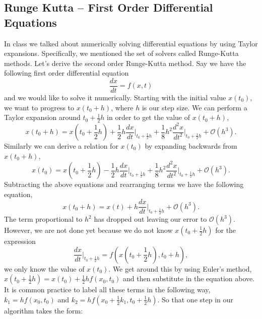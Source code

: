 \documentclass{article}
\begin{document}
\subsection{Runge Kutta -- First Order Differential Equations}
In class we talked about numerically solving differential equations by using Taylor expansions. Specifically, we mentioned the set of solvers called Runge-Kutta methods. Let's derive the second order Runge-Kutta method. Say we have the following first order differential equation
\begin{equation*}
\frac{dx}{dt} = f(x,t)
\end{equation*}
and we would like to solve it numerically. Starting with the initial value $x\left(t_0\right)$, we want to progress to $x\left(t_0 + h\right)$, where $h$ is our step size. We can perform a Taylor expansion around $t_0+\frac{1}{2}h$ in order to get the value of $x\left(t_0+h\right)$,
\begin{equation*}
x\left(t_0+h\right) = x(t_0+\frac{1}{2}h) + \frac{1}{2}h\frac{dx}{dt}\bigg|_{t_0+\frac{1}{2}h}+\frac{1}{8}h^2\frac{d^2x}{dt^2}\bigg|_{t_0+\frac{1}{2}h} + \mathcal{O}\left(h^3\right).
\end{equation*} 
Similarly we can derive a relation for $x\left(t_0\right)$ by expanding backwards from $x\left(t_0+h\right)$,
\begin{equation*}
x\left(t_0\right) = x(t_0+\frac{1}{2}h) - \frac{1}{2}h\frac{dx}{dt}\bigg|_{t_0+\frac{1}{2}h}+\frac{1}{8}h^2\frac{d^2x}{dt^2}\bigg|_{t_0+\frac{1}{2}h} + \mathcal{O}\left(h^3\right).
\end{equation*} 
Subtracting the above equations and rearranging terms we have the following equation,
\begin{equation*}
x\left(t_0+h\right) = x\left(t\right) + h\frac{dx}{dt}\bigg|_{t_0+\frac{1}{2}h} + \mathcal{O}\left(h^3\right).
\end{equation*}
The term proportional to $h^2$ has dropped out leaving our error to $\mathcal{O}\left(h^3\right)$. However, we are not done yet because we do not know $x\left(t_0+\frac{1}{2}h\right)$ for the expression
\begin{equation*}
\frac{dx}{dt}\bigg|_{t_0+\frac{1}{2}h} = f\left(x(t_0+\frac{1}{2}h), t_0+h\right),
\end{equation*}
we only know the value of $x\left(t_0\right)$. We get around this by using Euler's method, $x(t_0+\frac{1}{2}h) = x(t_0) + \frac{1}{2}hf(x_0, t_0)$ and then substitute in the equation above. It is common practice to label all these terms in the following way, $k_1 = hf(x_0, t_0)$ and $k_2 = hf(x_0+\frac{1}{2}k_1, t_0 + \frac{1}{2}h)$. So that one step in our algorithm takes the form:
\end{document}
